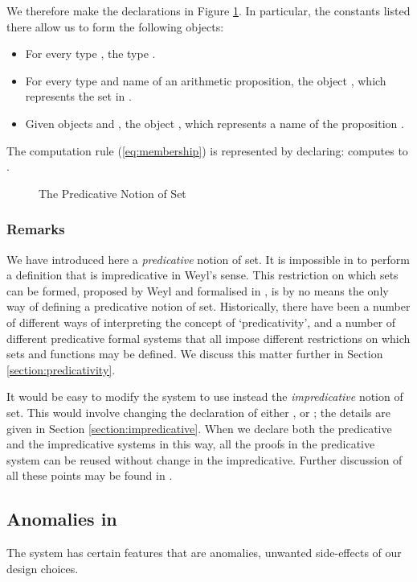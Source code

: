 \documentclass[acmtocl]{acmtrans2m}
\begin{document}
We therefore make the declarations in Figure \ref{fig:sets}.
In particular, the constants listed there allow us to form the following objects:
\begin{itemize}
 \item For every type , the type .
\item For every type  and name  of an arithmetic proposition, the object , which represents the set  in .
\item Given objects  and , the object , which represents a name of the proposition .
\end{itemize}
The computation rule (\ref{eq:membership}) is represented by declaring:  computes to .

\begin{figure}[top]

\caption{The Predicative Notion of Set}
\label{fig:sets}
\end{figure}



\subsubsection{Remarks}

\begin{longenum}
 \item
We have introduced here a \emph{predicative} notion of set.  It is impossible in  to perform a definition that is impredicative in Weyl's sense.
This restriction on which sets can be formed, proposed by Weyl and formalised in , is by no means the only way of defining a predicative notion of set.
Historically, there have been a number of different ways of interpreting the concept of `predicativity', and a number of different predicative formal systems that all impose different restrictions on which sets and functions may be defined.  We discuss this matter further in Section \ref{section:predicativity}.
\item
It would be easy to modify the system to use instead the \emph{impredicative} notion of set.  This would involve changing the declaration of either ,  or ; the details are given in Section \ref{section:impredicative}.  When we declare both the predicative and the impredicative systems in this way, all the proofs in the predicative system can be reused without change in the impredicative.  Further discussion of all these points may be found in \cite{luo:LTT06}.
\end{longenum}


\subsection{Anomalies in }
\label{section:anomalies}
The system  has certain features that are anomalies, unwanted side-effects of our design choices.
\end{document}
